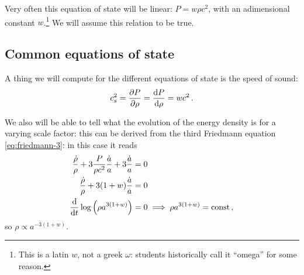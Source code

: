 \documentclass[main.tex]{subfiles}
\begin{document}
Very often this equation of state will be linear: \(P = w \rho c^2\), with an adimensional constant \(w\).\footnote{This is a latin \(w\), not a greek \(\omega \): students historically call it ``omega'' for some reason.}
We will assume this relation to be true.



\subsection{Common equations of state}

A thing we will compute for the different equations of state is the speed of sound: 
%
\begin{align}
c^2_{s} = \pdv{P}{\rho } = \dv{P}{\rho } = w c^2
\,.
\end{align}


We also will be able to tell what the evolution of the energy density is for a varying scale factor:
this can be derived from the third Friedmann equation \eqref{eq:friedmann-3}: in this case it reads 
%
\begin{align}
\frac{\dot{\rho}}{\rho } + 3\frac{P}{\rho c^2} \frac{\dot{a}}{a} + 3 \frac{\dot{a}}{a}  &= 0   \\
\frac{\dot{\rho}}{\rho } + 3 (1+w) \frac{\dot{a}}{a} &= 0 \\
\dv{}{t} \log \qty(\rho a^{3(1+w)}) &=0 \implies \rho a^{3(1+w)} = \text{const}
\,,
\end{align}
%
so \(\rho \propto a^{-3(1+w)}\).
\end{document}
